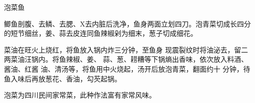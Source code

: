 \begin{recipe}{泡菜鱼}

\ingredients


\cooking

\step 鲫鱼剖腹、去鳞、去腮、X去内脏后洗净，鱼身两面立划四刀。泡青菜切成长四分的短节细丝，姜、蒜去皮连同鱼辣椒剁为细末，葱子切成细花。

菜油在旺火上烧红，将鱼放入锅内炸三分钟，至鱼身 现震裂纹时将油泌去，留二两菜油汪锅内。将鱼辣椒、姜、 蒜、葱、耢糟等下锅熵出香味，依次放入料酒、酱油、红酱 油、清汤等，将鱼用中火烧起，汤开后放泡青菜，翻面约十 分钟，待鱼入味后再放葱花、香油，勾芡起锅。

\notes

泡菜为四川民间家常菜，此种作法富有家常风味。

\end{recipe}

